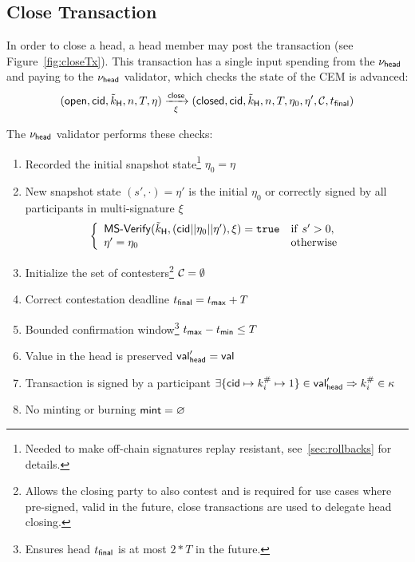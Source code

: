 \subsection{Close Transaction}\label{sec:close-tx}

In order to close a head, a head member may post the \mtxClose{} transaction
(see Figure~\ref{fig:closeTx}). This transaction has a single input
spending from the $\nu_\mathsf{head}$ and paying to the $\nu_\mathsf{head}$ validator, which checks
the state of the CEM is advanced:
\[
	(\mathsf{open},\mathsf{cid},\tilde{k}_{\mathsf{H}},n,T,\eta) \xrightarrow[\xi]{\mathsf{close}} (\mathsf{closed},\mathsf{cid},\tilde{k}_{\mathsf{H}},n,T,\eta_0,\eta',\mathcal{C},t_{\mathsf{final}})
\]

\begin{samepage}
	\noindent The $\nu_\mathsf{head}$ validator performs these checks:
	\begin{enumerate}
		\item Recorded the initial snapshot state\footnote{Needed to make off-chain signatures replay resistant, see~\ref{sec:rollbacks} for details.} $\eta_0 = \eta$
		\item New snapshot state $(s', \cdot) = \eta'$ is the initial $\eta_{0}$
		      or correctly signed by all participants in multi-signature $\xi$ \\
		      \[
			      \left\{\begin{array}{ll}
				      \mathsf{MS\textsf{-}{}Verify}(\tilde{k}_{\mathsf{H}},(\mathsf{cid} || \eta_{0} || \eta'),\xi) = \mathtt{true} & \mathrm{if} ~ s' > 0, \\
				      \eta' = \eta_{0}                                              & \mathrm{otherwise}
			      \end{array}\right.
		      \]
		\item Initialize the set of contesters\footnote{Allows the closing party
			      to also contest and is required for use cases where pre-signed, valid in
			      the future, close transactions are used to delegate head closing.}
		      $\mathcal{C} = \emptyset$
		\item Correct contestation deadline $t_{\mathsf{final}} = t_{\mathsf{max}} + T$ 
		\item Bounded confirmation window\footnote{Ensures head $t_{\mathsf{final}}$ is at most
			      $2*T$ in the future.} $t_{\mathsf{max}} - t_{\mathsf{min}} \leq T$
		\item Value in the head is preserved $\mathsf{val}_{\mathsf{head}}' = \mathsf{val}$
		\item Transaction is signed by a participant $\exists \{\mathsf{cid} \mapsto k^{\#}_{i} \mapsto 1\} \in \mathsf{val}_{\mathsf{head}}' \Rightarrow k^{\#}_{i} \in \kappa$
		\item No minting or burning $\mathsf{mint} = \varnothing$
	\end{enumerate}
\end{samepage}

